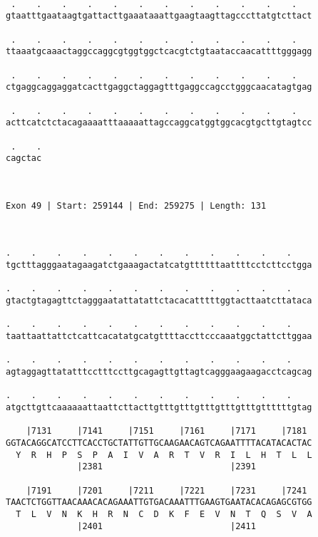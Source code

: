 \documentclass{article}
\begin{document}
\begin{Verbatim}
  
 .    .    .    .    .    .    .    .    .    .    .    .   
gtaatttgaataagtgattacttgaaataaattgaagtaagttagcccttatgtcttact
                                                            
 .    .    .    .    .    .    .    .    .    .    .    .   
ttaaatgcaaactaggccaggcgtggtggctcacgtctgtaataccaacattttgggagg
                                                            
 .    .    .    .    .    .    .    .    .    .    .    .   
ctgaggcaggaggatcacttgaggctaggagtttgaggccagcctgggcaacatagtgag
                                                            
 .    .    .    .    .    .    .    .    .    .    .    .   
acttcatctctacagaaaatttaaaaattagccaggcatggtggcacgtgcttgtagtcc
                                                            
 .    .
cagctac
       
       
 
Exon 49 | Start: 259144 | End: 259275 | Length: 131



.    .    .    .    .    .    .    .    .    .    .    .    
tgctttagggaatagaagatctgaaagactatcatgttttttaattttcctcttcctgga
                                                            
.    .    .    .    .    .    .    .    .    .    .    .    
gtactgtagagttctagggaatattatattctacacatttttggtacttaatcttataca
                                                            
.    .    .    .    .    .    .    .    .    .    .    .    
taattaattattctcattcacatatgcatgttttaccttcccaaatggctattcttggaa
                                                            
.    .    .    .    .    .    .    .    .    .    .    .    
agtaggagttatatttcctttccttgcagagttgttagtcagggaagaagacctcagcag
                                                            
.    .    .    .    .    .    .    .    .    .    .    .    
atgcttgttcaaaaaattaattcttacttgtttgtttgtttgtttgtttgttttttgtag
                                                            
    |7131     |7141     |7151     |7161     |7171     |7181 
GGTACAGGCATCCTTCACCTGCTATTGTTGCAAGAACAGTCAGAATTTTACATACACTAC
  Y  R  H  P  S  P  A  I  V  A  R  T  V  R  I  L  H  T  L  L
              |2381                         |2391           
  
    |7191     |7201     |7211     |7221     |7231     |7241 
TAACTCTGGTTAACAAACACAGAAATTGTGACAAATTTGAAGTGAATACACAGAGCGTGG
  T  L  V  N  K  H  R  N  C  D  K  F  E  V  N  T  Q  S  V  A
              |2401                         |2411           
  

\end{Verbatim}
\end{document}
